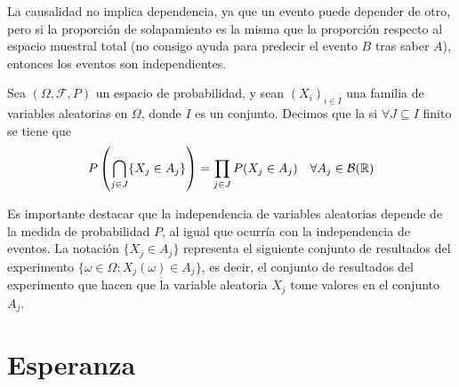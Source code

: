 \begin{observacion}
    La causalidad no implica dependencia, ya que un evento puede depender de otro, pero si la proporción de solapamiento es la misma que la proporción respecto al espacio muestral total (no consigo ayuda para predecir el evento $B$ tras saber $A$), entonces los eventos son independientes.
\end{observacion}

\begin{ejemplo}
\end{ejemplo}

\begin{ejemplo}[Libro 3.15]
\end{ejemplo}

\begin{definicion}
    Sea $(\Omega, \mathcal{F}, P)$ un espacio de probabilidad, y sean $(X_i)_{i\in I}$ una familia de variables aleatorias en $\Omega$, donde $I$ es un conjunto. Decimos que la  si $\forall J\subseteq I$ finito se tiene que 
    \begin{equation*}
        P\left(\bigcap_{j\in J} \{X_j \in A_j\}\right) = \prod_{j\in J} P(X_j \in A_j) \quad \forall A_j \in \mathcal{B}(\mathbb{R})
    \end{equation*}
\end{definicion}

\noindent
Es importante destacar que la independencia de variables aleatorias depende de la medida de probabilidad $P$, al igual que ocurría con la independencia de eventos. La notación $\{X_j \in A_j\}$ representa el siguiente conjunto de resultados del experimento $\{\omega \in \Omega : X_j(\omega) \in A_j\}$, es decir, el conjunto de resultados del experimento que hacen que la variable aleatoria $X_j$ tome valores en el conjunto $A_j$.

\section{Esperanza}

